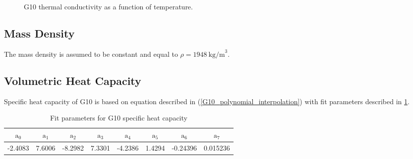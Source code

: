 \begin{figure}[H]
    \centering
    \caption{G10 thermal conductivity as a function of temperature.}
    \label{fig:g10_k_plot}
\end{figure}
 
 \subsection{Mass Density}
 The mass density is assumed to be constant and equal to $\rho = 1948~\text{kg/m}^{3}$.

\subsection{Volumetric Heat Capacity}
Specific heat capacity of G10 is based on equation described in (\ref{G10_polynomial_interpolation}) with fit parameters described in \ref{table:nist_g10_cp_parameters}. 

\begin{table}[H]
    \caption{Fit parameters for G10 specific heat capacity} 
    \vspace{-1.em} 
    \fontsize{10}{10}
    \selectfont 
    \renewcommand{\arraystretch}{1.5}
    \begin{center}
    \begin{tabular}{ cccccccc }  
    $\text{a}_0$ & $\text{a}_1$ & $\text{a}_2$ & $\text{a}_3$ & $\text{a}_4$ & $\text{a}_5$ & $\text{a}_6$ & $\text{a}_7$ \\
    \hline
    -2.4083 & 7.6006 & -8.2982 & 7.3301 & -4.2386 & 1.4294 & -0.24396 & 0.015236 \\
    \hline 
    \end{tabular}
    \end{center}  
     \label{table:nist_g10_cp_parameters} 
 \end{table}

